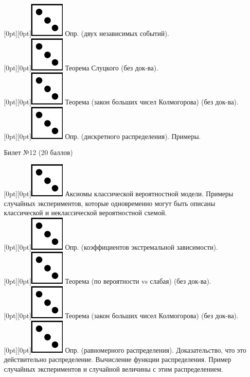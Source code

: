 \documentclass[10pt]{article}
\begin{document}
\raisebox{-1pt}[0pt][0pt]{\includegraphics[width=0.02\linewidth]{3.png}} Опр. (двух независимых событий). \\
\raisebox{-1pt}[0pt][0pt]{\includegraphics[width=0.02\linewidth]{3.png}} Теорема Слуцкого (без док-ва). \\
\raisebox{-1pt}[0pt][0pt]{\includegraphics[width=0.02\linewidth]{3.png}} Теорема (закон больших чисел Колмогорова) (без док-ва). \\
\raisebox{-1pt}[0pt][0pt]{\includegraphics[width=0.02\linewidth]{3.png}} Опр. (дискретного распределения). Примеры. \\
\begin{center} {\Large Билет №12 (20 баллов)} \end{center}
\raisebox{-1pt}[0pt][0pt]{\includegraphics[width=0.02\linewidth]{3.png}} Аксиомы классической вероятностной модели. Примеры случайных экспериментов, которые одновременно могут быть описаны классической и неклассической вероятностной схемой. \\
\raisebox{-1pt}[0pt][0pt]{\includegraphics[width=0.02\linewidth]{3.png}} Опр. (коэффициентов экстремальной зависимости). \\
\raisebox{-1pt}[0pt][0pt]{\includegraphics[width=0.02\linewidth]{3.png}} Теорема (по вероятности vs слабая) (без док-ва). \\  
\raisebox{-1pt}[0pt][0pt]{\includegraphics[width=0.02\linewidth]{3.png}} Теорема (закон больших чисел Колмогорова) (без док-ва). \\
\raisebox{-1pt}[0pt][0pt]{\includegraphics[width=0.02\linewidth]{3.png}}  Опр. (равномерного распределения). Доказательство, что это действительно распределение. Вычисление функции распределения. Пример случайных экспериментов и случайной величины с этим распределением. \\
\end{document}
